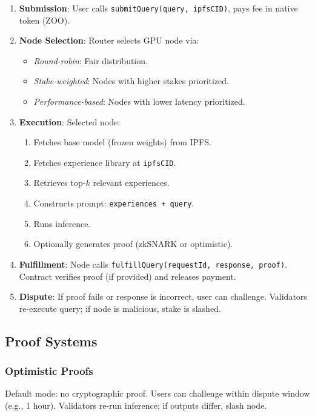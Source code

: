 \begin{enumerate}
\item \textbf{Submission}: User calls \texttt{submitQuery(query, ipfsCID)}, pays fee in native token (ZOO).
\item \textbf{Node Selection}: Router selects GPU node via:
   \begin{itemize}
   \item \textit{Round-robin}: Fair distribution.
   \item \textit{Stake-weighted}: Nodes with higher stakes prioritized.
   \item \textit{Performance-based}: Nodes with lower latency prioritized.
   \end{itemize}
\item \textbf{Execution}: Selected node:
   \begin{enumerate}
   \item Fetches base model (frozen weights) from IPFS.
   \item Fetches experience library at \texttt{ipfsCID}.
   \item Retrieves top-$k$ relevant experiences.
   \item Constructs prompt: \texttt{experiences + query}.
   \item Runs inference.
   \item Optionally generates proof (zkSNARK or optimistic).
   \end{enumerate}
\item \textbf{Fulfillment}: Node calls \texttt{fulfillQuery(requestId, response, proof)}. Contract verifies proof (if provided) and releases payment.
\item \textbf{Dispute}: If proof fails or response is incorrect, user can challenge. Validators re-execute query; if node is malicious, stake is slashed.
\end{enumerate}

\subsection{Proof Systems}

\subsubsection{Optimistic Proofs}

Default mode: no cryptographic proof. Users can challenge within dispute window (e.g., 1 hour). Validators re-run inference; if outputs differ, slash node.

